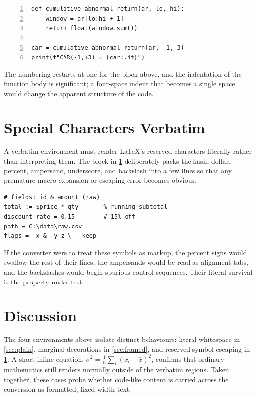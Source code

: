 \documentclass[11pt]{article}
\begin{document}
\begin{Verbatim}[frame=single,numbers=left]
def cumulative_abnormal_return(ar, lo, hi):
    window = ar[lo:hi + 1]
    return float(window.sum())

car = cumulative_abnormal_return(ar, -1, 3)
print(f"CAR(-1,+3) = {car:.4f}")
\end{Verbatim}

The numbering restarts at one for the block above, and the indentation of the
function body is significant; a four-space indent that becomes a single space
would change the apparent structure of the code.

\section{Special Characters Verbatim}
\label{sec:special}

A verbatim environment must render LaTeX's reserved characters literally rather
than interpreting them. The block in \cref{sec:special} deliberately packs the
hash, dollar, percent, ampersand, underscore, and backslash into a few lines so
that any premature macro expansion or escaping error becomes obvious.

\begin{Verbatim}
# fields: id & amount (raw)
total := $price * qty       % running subtotal
discount_rate = 0.15        # 15% off
path = C:\data\raw.csv
flags = -x & -y_z \ --keep
\end{Verbatim}

If the converter were to treat these symbols as markup, the percent signs would
swallow the rest of their lines, the ampersands would be read as alignment tabs,
and the backslashes would begin spurious control sequences. Their literal
survival is the property under test.

\section{Discussion}
\label{sec:discussion}

The four environments above isolate distinct behaviours: literal whitespace in
\cref{sec:plain}, marginal decorations in \cref{sec:framed}, and reserved-symbol
escaping in \cref{sec:special}. A short inline equation, $\sigma^2 = \tfrac{1}{n}
\sum_i (x_i - \bar{x})^2$, confirms that ordinary mathematics still renders
normally outside of the verbatim regions. Taken together, these cases probe
whether code-like content is carried across the conversion as formatted,
fixed-width text.
\end{document}
